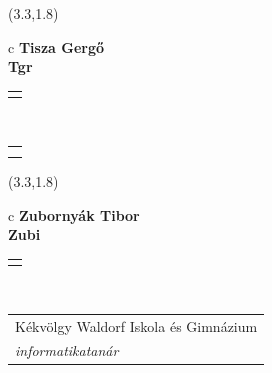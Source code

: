 \documentclass[11pt]{article}
\begin{document}
\makebox(3.3,1.8){
  \renewcommand\arraystretch{1.3}
  \begin{tabular}[c]{c}
    \hspace{8.5mm}
    \LARGE\bf{ Tisza Gergő }\\
    \hspace{8.5mm}
    \Large{ Tgr }\\
    \renewcommand\arraystretch{3}
    \begin{tabular}[c]{c}
      \centering
      \fontfamily{phv}\selectfont{
        \textbf{
          \textsc{
            \scriptsize{
            \color{Bright}{ Ismerkedő }\color{Bright}{ Webmester }\color{Bright}{ Sminkmester }\color{Dark}{ Programozó }
            }
          }
        }
      }
    \end{tabular}
    \\
    \renewcommand\arraystretch{1}
    \begin{tabular}{p{3.3in}}
      \hspace{.7cm}\\
      \hspace{.7cm}\emph{  }\\
    \end{tabular}
  \end{tabular}
}

\makebox(3.3,1.8){
  \renewcommand\arraystretch{1.3}
  \begin{tabular}[c]{c}
    \hspace{8.5mm}
    \LARGE\bf{ Zubornyák Tibor }\\
    \hspace{8.5mm}
    \Large{ Zubi }\\
    \renewcommand\arraystretch{3}
    \begin{tabular}[c]{c}
      \centering
      \fontfamily{phv}\selectfont{
        \textbf{
          \textsc{
            \scriptsize{
            \color{Dark}{ Ismerkedő }\color{Dark}{ Webmester }\color{Bright}{ Sminkmester }\color{Bright}{ Programozó }
            }
          }
        }
      }
    \end{tabular}
    \\
    \renewcommand\arraystretch{1}
    \begin{tabular}{p{3.3in}}
      \hspace{.7cm}Kékvölgy Waldorf Iskola és Gimnázium\\
      \hspace{.7cm}\emph{ informatikatanár }\\
    \end{tabular}
  \end{tabular}
}
\end{document}
